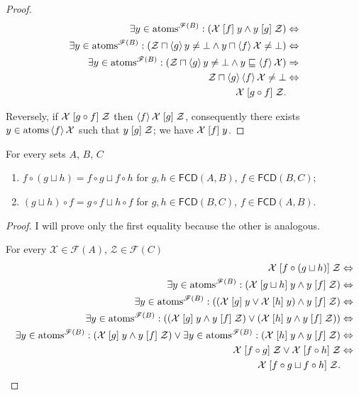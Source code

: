 \begin{proof}
~
\begin{align*}
\exists y\in\operatorname{atoms}^{\mathscr{F}(B)}:(\mathcal{X}\mathrel{\left[f\right]}y\land y\mathrel{\left[g\right]}\mathcal{Z}) & \Leftrightarrow\\
\exists y\in\operatorname{atoms}^{\mathscr{F}(B)}:(\mathcal{Z}\sqcap\left\langle g\right\rangle y\ne\bot\land y\sqcap\left\langle f\right\rangle\mathcal{X}\ne\bot) & \Leftrightarrow\\
\exists y\in\operatorname{atoms}^{\mathscr{F}(B)}:(\mathcal{Z}\sqcap\left\langle g\right\rangle y\ne\bot\land y\sqsubseteq\left\langle f\right\rangle\mathcal{X}) &
\Rightarrow\\
\mathcal{Z}\sqcap\left\langle g\right\rangle\left\langle f\right\rangle\mathcal{X}\ne\bot &
\Leftrightarrow\\
\mathcal{X}\mathrel{\left[g\circ f\right]}\mathcal{Z}.
\end{align*}


Reversely, if $\mathcal{X}\mathrel{\left[g\circ f\right]}\mathcal{Z}$ then $\left\langle f\right\rangle\mathcal{X}\mathrel{\left[g\right]}\mathcal{Z}$,
consequently there exists $y\in\operatorname{atoms}\left\langle f\right\rangle\mathcal{X}$ such that
$y\mathrel{\left[g\right]}\mathcal{Z}$; we have $\mathcal{X}\mathrel{\left[f\right]}y$.\end{proof}
\begin{thm}
For every sets $A$, $B$, $C$
\begin{enumerate}
\item $f\circ(g\sqcup h)=f\circ g\sqcup f\circ h$ for $g,h\in\mathsf{FCD}(A,B)$,
$f\in\mathsf{FCD}(B,C)$;
\item $(g\sqcup h)\circ f=g\circ f\sqcup h\circ f$ for
$g,h\in\mathsf{FCD}(B,C)$,
$f\in\mathsf{FCD}(A,B)$.
\end{enumerate}
\end{thm}
\begin{proof}
I will prove only the first equality because the other is analogous.

For every $\mathcal{X}\in\mathscr{F}(A)$, $\mathcal{Z}\in\mathscr{F}(C)$
\begin{align*}
\mathcal{X}\mathrel{\left[f\circ(g\sqcup h)\right]}\mathcal{Z} & \Leftrightarrow\\
\exists y\in\operatorname{atoms}^{\mathscr{F}(B)}:(\mathcal{X}\mathrel{\left[g\sqcup h\right]}y\land
y\mathrel{\left[f\right]}\mathcal{Z}) & \Leftrightarrow\\
\exists y\in\operatorname{atoms}^{\mathscr{F}(B)}:((\mathcal{X}\mathrel{\left[g\right]}y\lor\mathcal{X}\mathrel{\left[h\right]}y)\land y\mathrel{\left[f\right]}\mathcal{Z}) & \Leftrightarrow\\
\exists y\in\operatorname{atoms}^{\mathscr{F}(B)}:((\mathcal{X}\mathrel{\left[g\right]}y\land y\mathrel{\left[f\right]}\mathcal{Z})\lor(\mathcal{X}\mathrel{\left[h\right]}y\land y\mathrel{\left[f\right]}\mathcal{Z})) &
\Leftrightarrow\\
\exists y\in\operatorname{atoms}^{\mathscr{F}(B)}:(\mathcal{X}\mathrel{\left[g\right]}y\land y\mathrel{\left[f\right]}\mathcal{Z})\lor\exists y\in\operatorname{atoms}^{\mathscr{F}(B)}:(\mathcal{X}\mathrel{\left[h\right]}y\land
y\mathrel{\left[f\right]}\mathcal{Z}) & \Leftrightarrow\\
\mathcal{X}\mathrel{\left[f\circ g\right]}\mathcal{Z}\lor\mathcal{X}\mathrel{\left[f\circ
h\right]}\mathcal{Z} & \Leftrightarrow\\
\mathcal{X}\mathrel{\left[f\circ g\sqcup f\circ h\right]}\mathcal{Z}.
\end{align*}

\end{proof}
